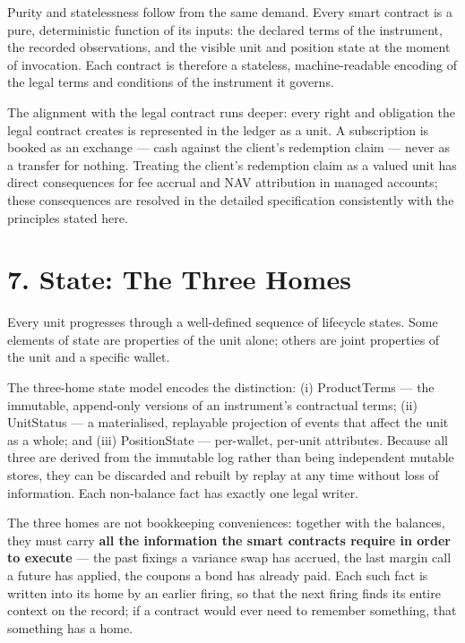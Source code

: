 \documentclass[11pt,a4paper]{article}
\newcommand{\clabel}[1]{\leavevmode\hypertarget{clause-#1}{}%
  \marginpar{\raggedright\scriptsize\ttfamily\textcolor{gray}{#1}}}
\begin{document}
Purity and statelessness follow from the same demand. \clabel{C-6.4}Every smart
contract is a pure, deterministic function of its inputs: the declared
terms of the instrument, the recorded observations, and the visible unit
and position state at the moment of invocation. Each contract is
therefore a stateless, machine-readable encoding of the legal terms and
conditions of the instrument it governs.

\clabel{C-6.5}The alignment with the legal contract runs deeper: every right and
obligation the legal contract creates is represented in the ledger as a
unit. A subscription is booked as an exchange --- cash against the
client's redemption claim --- never as a transfer for nothing. \clabel{C-6.6}Treating
the client's redemption claim as a valued unit has direct consequences
for fee accrual and NAV attribution in managed accounts; these
consequences are resolved in the detailed specification consistently
with the principles stated here.

\hypertarget{state-the-three-homes}{%
\section{7. State: The Three Homes}\label{state-the-three-homes}}

\clabel{C-7.1}Every unit progresses through a well-defined sequence of lifecycle
states. Some elements of state are properties of the unit alone; others
are joint properties of the unit and a specific wallet.

\clabel{C-7.2}The three-home state model encodes the distinction: (i) ProductTerms ---
the immutable, append-only versions of an instrument's contractual
terms; (ii) UnitStatus --- a materialised, replayable projection of
events that affect the unit as a whole; and (iii) PositionState ---
per-wallet, per-unit attributes. \clabel{C-7.3}Because all three are derived from the
immutable log rather than being independent mutable stores, they can be
discarded and rebuilt by replay at any time without loss of information.
Each non-balance fact has exactly one legal writer.

\clabel{C-7.4}The three homes are not bookkeeping conveniences: together with the
balances, they must carry \textbf{all the information the smart
contracts require in order to execute} --- the past fixings a variance
swap has accrued, the last margin call a future has applied, the coupons
a bond has already paid. Each such fact is written into its home by an
earlier firing, so that the next firing finds its entire context on the
record; if a contract would ever need to remember something, that
something has a home.
\end{document}
